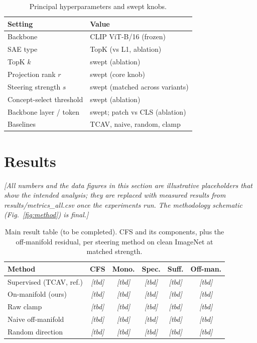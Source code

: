\documentclass[conference]{IEEEtran}
\newcommand{\pending}[1]{\textcolor{pendingcolor}{\textit{[#1]}}}
\begin{document}
\begin{table}[t]
\caption{Principal hyperparameters and swept knobs.}
\label{tab:hparams}
\centering
\begin{tabular}{ll}
\toprule
Setting & Value \\
\midrule
Backbone & CLIP ViT-B/16 (frozen) \\
SAE type & TopK (vs L1, ablation) \\
TopK $k$ & swept (ablation) \\
Projection rank $r$ & swept (core knob) \\
Steering strength $s$ & swept (matched across variants) \\
Concept-select threshold & swept (ablation) \\
Backbone layer / token & swept; patch vs CLS (ablation) \\
Baselines & TCAV, naive, random, clamp \\
\bottomrule
\end{tabular}
\end{table}

\section{Results}
\label{sec:results}

\pending{All numbers and the data figures in this section are illustrative placeholders that show the intended analysis; they are replaced with measured results from results/metrics\_all.csv once the experiments run. The methodology schematic (Fig.~\ref{fig:method}) is final.}

\begin{table}[t]
\caption{Main result table (to be completed). CFS and its components, plus the off-manifold residual, per steering method on clean ImageNet at matched strength.}
\label{tab:main}
\centering
\setlength{\tabcolsep}{3pt}
\begin{tabular}{lccccc}
\toprule
Method & CFS & Mono. & Spec. & Suff. & Off-man. \\
\midrule
Supervised (TCAV, ref.) & \pending{tbd} & \pending{tbd} & \pending{tbd} & \pending{tbd} & \pending{tbd} \\
On-manifold (ours) & \pending{tbd} & \pending{tbd} & \pending{tbd} & \pending{tbd} & \pending{tbd} \\
Raw clamp & \pending{tbd} & \pending{tbd} & \pending{tbd} & \pending{tbd} & \pending{tbd} \\
Naive off-manifold & \pending{tbd} & \pending{tbd} & \pending{tbd} & \pending{tbd} & \pending{tbd} \\
Random direction & \pending{tbd} & \pending{tbd} & \pending{tbd} & \pending{tbd} & \pending{tbd} \\
\bottomrule
\end{tabular}
\end{table}
\end{document}
